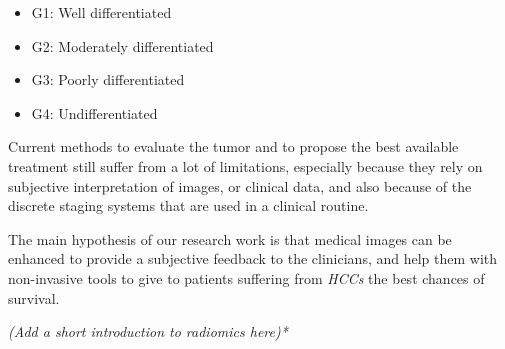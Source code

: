 \documentclass[]{article}
\providecommand{\tightlist}{%
  \setlength{\itemsep}{0pt}\setlength{\parskip}{0pt}}
\begin{document}
\begin{itemize}
\tightlist
\item
  G1: Well differentiated
\item
  G2: Moderately differentiated
\item
  G3: Poorly differentiated
\item
  G4: Undifferentiated
\end{itemize}

Current methods to evaluate the tumor and to propose the best available
treatment still suffer from a lot of limitations, especially because
they rely on subjective interpretation of images, or clinical data, and
also because of the discrete staging systems that are used in a clinical
routine.

The main hypothesis of our research work is that medical images can be
enhanced to provide a subjective feedback to the clinicians, and help
them with non-invasive tools to give to patients suffering from
\emph{HCCs} the best chances of survival.

\emph{(Add a short introduction to radiomics here)*}
\end{document}
